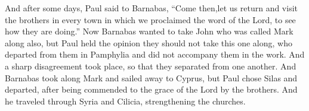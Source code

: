 \begin{biblechapter}
 And after some days, Paul said to Barnabas, “Come then,let us return and visit the brothers in every town in which we proclaimed the word of the Lord, to see how they are doing.”
\verse Now Barnabas wanted to take John who was called Mark along also,
\verse but Paul held the opinion they should not take this one along, who departed from them in Pamphylia and did not accompany them in the work.
\verse And a sharp disagreement took place, so that they separated from one another. And Barnabas took along Mark and sailed away to Cyprus,
\verse but Paul chose Silas and departed, after being commended to the grace of the Lord by the brothers.
\verse And he traveled through Syria and Cilicia, strengthening the churches.
\end{biblechapter}

